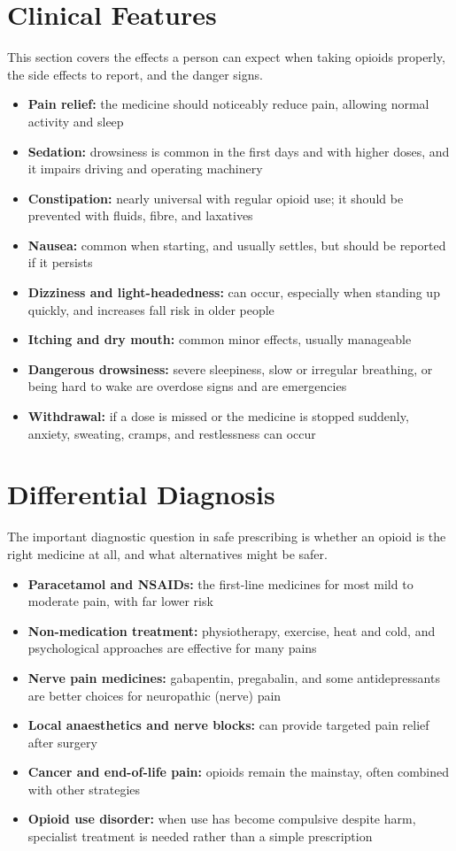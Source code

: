 \section*{Clinical Features}
This section covers the effects a person can expect when taking opioids properly, the side effects to report, and the danger signs.

\begin{itemize}
    \item \textbf{Pain relief:} the medicine should noticeably reduce pain, allowing normal activity and sleep
    \item \textbf{Sedation:} drowsiness is common in the first days and with higher doses, and it impairs driving and operating machinery
    \item \textbf{Constipation:} nearly universal with regular opioid use; it should be prevented with fluids, fibre, and laxatives
    \item \textbf{Nausea:} common when starting, and usually settles, but should be reported if it persists
    \item \textbf{Dizziness and light-headedness:} can occur, especially when standing up quickly, and increases fall risk in older people
    \item \textbf{Itching and dry mouth:} common minor effects, usually manageable
    \item \textbf{Dangerous drowsiness:} severe sleepiness, slow or irregular breathing, or being hard to wake are overdose signs and are emergencies
    \item \textbf{Withdrawal:} if a dose is missed or the medicine is stopped suddenly, anxiety, sweating, cramps, and restlessness can occur
\end{itemize}

\section*{Differential Diagnosis}
The important diagnostic question in safe prescribing is whether an opioid is the right medicine at all, and what alternatives might be safer.

\begin{itemize}
    \item \textbf{Paracetamol and NSAIDs:} the first-line medicines for most mild to moderate pain, with far lower risk
    \item \textbf{Non-medication treatment:} physiotherapy, exercise, heat and cold, and psychological approaches are effective for many pains
    \item \textbf{Nerve pain medicines:} gabapentin, pregabalin, and some antidepressants are better choices for neuropathic (nerve) pain
    \item \textbf{Local anaesthetics and nerve blocks:} can provide targeted pain relief after surgery
    \item \textbf{Cancer and end-of-life pain:} opioids remain the mainstay, often combined with other strategies
    \item \textbf{Opioid use disorder:} when use has become compulsive despite harm, specialist treatment is needed rather than a simple prescription
\end{itemize}

